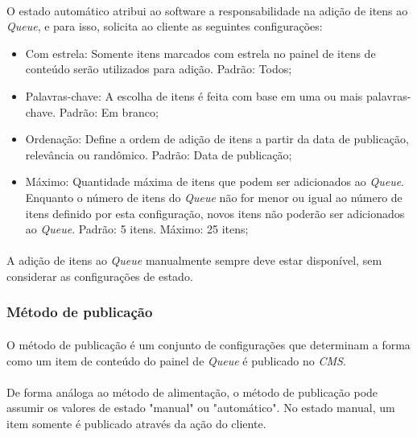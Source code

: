 \documentclass[a4paper,12pt]{article}
\def\blog{\emph{CMS}}
\def\queue{\emph{Queue}}
\begin{document}
\paragraph{}
O estado automático atribui ao software a responsabilidade na adição de itens
ao \queue{}, e para isso, solicita ao cliente as seguintes configurações:

\begin{itemize}

\item Com estrela: Somente itens marcados com estrela no painel de itens de
conteúdo serão utilizados para adição. Padrão: Todos;

\item Palavras-chave: A escolha de itens é feita com base em uma ou mais
palavras-chave. Padrão: Em branco;

\item Ordenação: Define a ordem de adição de itens a partir da data de
publicação, relevância ou randômico. Padrão: Data de publicação;

\item Máximo: Quantidade máxima de itens que podem ser adicionados ao \queue{}.
Enquanto o número de itens do \queue{} não for menor ou igual ao número de
itens definido por esta configuração, novos itens não poderão ser adicionados
ao \queue{}. Padrão: 5 itens. Máximo: 25 itens;

\end{itemize}

\paragraph{}
A adição de itens ao \queue{} manualmente sempre deve estar disponível, sem
considerar as configurações de estado.

\subsubsection{Método de publicação} \label{metodopublicacao}

\paragraph{}
O método de publicação é um conjunto de configurações que determinam a forma
como um item de conteúdo do painel de \queue{} é publicado no \blog{}.

\paragraph{}
De forma análoga ao método de alimentação, o método de publicação pode assumir
os valores de estado "manual" ou "automático". No estado manual, um item
somente é publicado através da ação do cliente.
\end{document}
